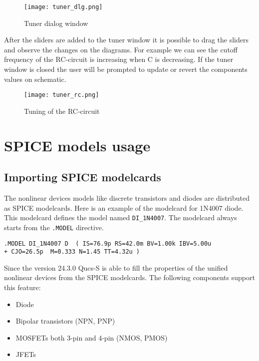     \begin{figure}[!ht]
    \begin{center}
        \texttt{[image: tuner\_dlg.png]}
    \end{center}
    \caption{Tuner dialog window} \label{fig:tuner_dlg}
    \end{figure}

After the sliders are added to the tuner window it is possible to drag the sliders and observe the changes on the diagrams. For example we can see the cutoff frequency of the RC-circuit is increasing when C is decreasing. If the tuner window is closed the user will be prompted to update or revert the components values on schematic.

    \begin{figure}[!ht]
    \begin{center}
        \texttt{[image: tuner\_rc.png]}
    \end{center}
    \caption{Tuning of the RC-circuit} \label{fig:tuner_rc}
    \end{figure}


\section{SPICE models usage}

\subsection{Importing SPICE modelcards}

The nonlinear devices models like discrete transistors and diodes are distributed as SPICE modelcards. Here is an example of the modelcard for 1N4007 diode. This modelcard defines the model named \verb|DI_1N4007|. The modelcard always starts from the \verb|.MODEL| directive.

\begin{verbatim}
.MODEL DI_1N4007 D  ( IS=76.9p RS=42.0m BV=1.00k IBV=5.00u
+ CJO=26.5p  M=0.333 N=1.45 TT=4.32u )
\end{verbatim}

Since the version 24.3.0 Qucs-S is able to fill the properties of the unified nonlinear devices from the SPICE modelcards. The following components support this feature:

\begin{itemize}
 \item Diode
 \item Bipolar transistors (NPN, PNP)
 \item MOSFETs both 3-pin and 4-pin (NMOS, PMOS)
 \item JFETs
\end{itemize}

